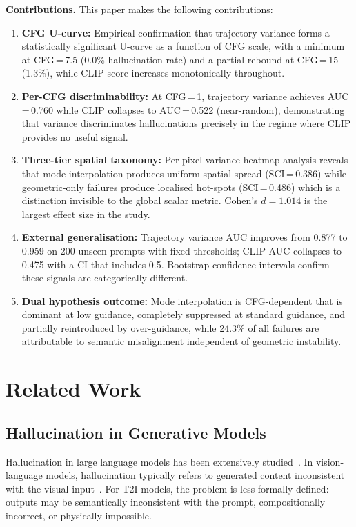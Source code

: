 \documentclass[conference]{IEEEtran}
\begin{document}
\textbf{Contributions.} This paper makes the following contributions:

\begin{enumerate}
  \item \textbf{CFG U-curve:} Empirical confirmation that trajectory
  variance forms a statistically significant U-curve as a function
  of CFG scale, with a minimum at CFG\,=\,7.5 (0.0\% hallucination
  rate) and a partial rebound at CFG\,=\,15 (1.3\%), while CLIP
  score increases monotonically throughout.

  \item \textbf{Per-CFG discriminability:} At CFG\,=\,1, trajectory
  variance achieves AUC\,=\,0.760 while CLIP collapses to
  AUC\,=\,0.522 (near-random), demonstrating that variance
  discriminates hallucinations precisely in the regime where CLIP
  provides no useful signal.

  \item \textbf{Three-tier spatial taxonomy:} Per-pixel variance
  heatmap analysis reveals that mode interpolation produces uniform
  spatial spread (SCI\,=\,0.386) while geometric-only failures
  produce localised hot-spots (SCI\,=\,0.486) which is a distinction
  invisible to the global scalar metric. Cohen's $d{=}1.014$ is
  the largest effect size in the study.

  \item \textbf{External generalisation:} Trajectory variance AUC
  improves from 0.877 to 0.959 on 200 unseen prompts with fixed
  thresholds; CLIP AUC collapses to 0.475 with a CI that includes
  0.5. Bootstrap confidence intervals confirm these signals are
  categorically different.

  \item \textbf{Dual hypothesis outcome:} Mode interpolation is
  CFG-dependent that is dominant at low guidance, completely suppressed
  at standard guidance, and partially reintroduced by
  over-guidance, while 24.3\% of all failures are attributable
  to semantic misalignment independent of geometric instability.
\end{enumerate}

\section{Related Work}
\label{sec:related}

\subsection{Hallucination in Generative Models}
Hallucination in large language models has been extensively
studied~\cite{ji2023survey}. In vision-language models, hallucination
typically refers to generated content inconsistent with the visual
input~\cite{li2023evaluating}. For T2I models, the problem is less
formally defined: outputs may be semantically inconsistent with the
prompt, compositionally incorrect, or physically impossible.
\end{document}
